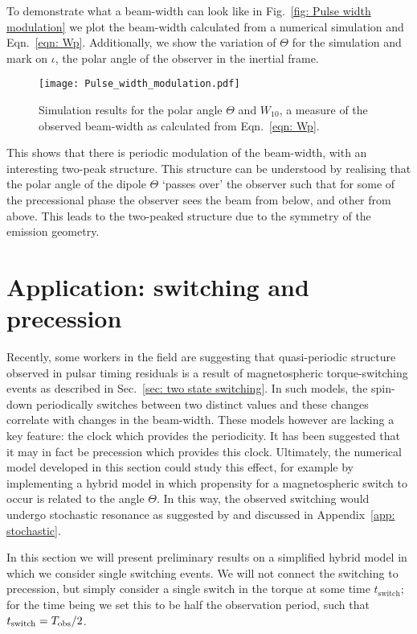 \documentclass[../full_thesis/full_thesis.tex]{subfiles}
\begin{document}
To demonstrate what a beam-width can look like in Fig.~\ref{fig: Pulse width
modulation} we plot the beam-width calculated from a numerical simulation and
Eqn.~\eqref{eqn: Wp}. Additionally, we show the variation of $\Theta$ for the
simulation and mark on $\iota$, the polar angle of the observer in the inertial
frame.
\begin{figure}[ht]
\centering
\texttt{[image: Pulse\_width\_modulation.pdf]}
\caption{Simulation results for the polar angle $\Theta$ and $W_{10}$, a
measure of the observed beam-width as calculated from Eqn.~\eqref{eqn: Wp}.}
\label{fig: Pulse width modulation}
\end{figure}
This shows that there is periodic modulation of the beam-width, with an
interesting two-peak structure. This structure can be understood by realising
that the polar angle of the dipole $\Theta$ `passes over' the observer such
that for some of the precessional phase the observer sees the beam from below,
and other from above. This leads to the two-peaked structure due to the
symmetry of the emission geometry.


\section{Application: switching and precession}

Recently, some workers in the field \citep{Lyne2010, Perera2015} are suggesting
that quasi-periodic structure observed in pulsar timing residuals is a result
of magnetospheric torque-switching events as described in Sec.~\ref{sec: two
state switching}. In such models, the spin-down periodically switches between
two distinct values and these changes correlate with changes in the beam-width.
These models however are lacking a key feature: the clock which provides the
periodicity. It has been suggested \citep{Jones2012} that it may in fact be
precession which provides this clock. Ultimately, the numerical model developed
in this section could study this effect, for example by implementing a hybrid
model in which propensity for a magnetospheric switch to occur is related to
the angle $\Theta$. In this way, the observed switching would undergo
stochastic resonance as suggested by \citet{Cordes2013} and discussed in Appendix~\ref{app:
stochastic}.

In this section we will present preliminary results on a simplified hybrid model
in which we consider single switching events. We will not connect the switching
to precession, but simply consider a single switch in the torque at some time
$t_{\mathrm{switch}}$; for the time being we set this to be half the
observation period, such that $t_{\mathrm{switch}} = T_{\textrm{obs}}/2$.
\end{document}
